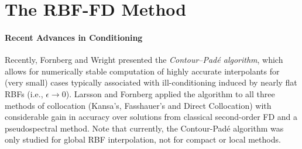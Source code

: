 \documentclass{report}
\begin{document}
{%



%









\part{The RBF-FD Method}




\subsection{Recent Advances in Conditioning}

Recently, Fornberg and Wright 
\cite{Fornberg2004} presented the \emph{Contour--Pad\'{e} algorithm}, which allows for numerically stable 
computation of highly 
accurate interpolants for (very small) cases typically associated with ill-conditioning induced by nearly flat RBFs (i.e., $\epsilon \rightarrow 0$). Larsson and Fornberg \cite{Larsson2003} 
applied the 
algorithm to all three methods of collocation (Kansa's, Fasshauer's and Direct Collocation) with considerable gain in accuracy over solutions from classical second-order FD and a pseudospectral method. Note that currently, the Contour-Pad\'{e} 
algorithm was only studied for global RBF interpolation, not for compact or local methods. 

}
\end{document}
